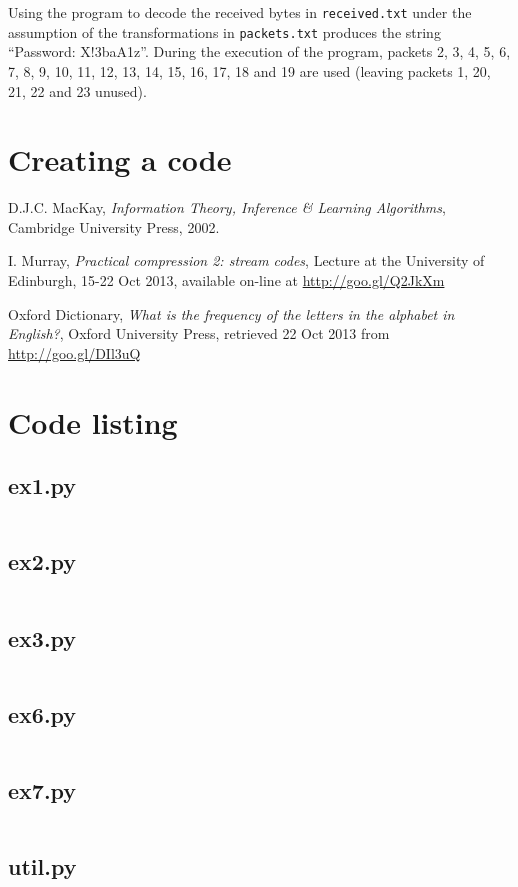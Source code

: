 \documentclass[10pt,a4paper,oneside,onecolumn]{article}
\newcommand*{\receivedTXT}{{\tt received.txt}\xspace}
\newcommand*{\packetsTXT}{{\tt packets.txt}\xspace}
\begin{document}
Using the program to decode the received bytes in \receivedTXT under the
assumption of the transformations in \packetsTXT produces the string ``Password:
X!3baA1z''. During the execution of the program, packets 2, 3, 4, 5, 6, 7, 8, 9,
10, 11, 12, 13, 14, 15, 16, 17, 18 and 19 are used (leaving packets 1, 20, 21,
22 and 23 unused).

\section{Creating a code}\label{sec:ex8}


\begin{thebibliography}{9}

    D.J.C. MacKay,
    \emph{Information Theory, Inference \& Learning Algorithms},
    Cambridge University Press,
    2002.

    I. Murray,
    \emph{Practical compression 2: stream codes},
    Lecture at the University of Edinburgh,
    15-22 Oct 2013,
    available on-line at \url{http://goo.gl/Q2JkXm}

    Oxford Dictionary,
    \emph{What is the frequency of the letters in the alphabet in English?},
    Oxford University Press,
    retrieved 22 Oct 2013 from \url{http://goo.gl/DIl3uQ}

\end{thebibliography}


\onecolumn
\appendixpage
\appendix

\section{Code listing}

\subsection{ex1.py}\label{app:ex1}
\inputminted{python}{../src/ex1.py}
\newpage

\subsection{ex2.py}\label{app:ex2}
\inputminted{python}{../src/ex2.py}
\newpage

\subsection{ex3.py}\label{app:ex3}
\inputminted{python}{../src/ex3.py}
\newpage

\subsection{ex6.py}\label{app:ex6}
\inputminted{python}{../src/ex6.py}
\newpage

\subsection{ex7.py}\label{app:ex7}
\inputminted{python}{../src/ex7.py}
\newpage

\subsection{util.py}\label{app:util}
\inputminted{python}{../src/util.py}
\end{document}
